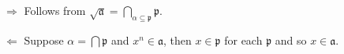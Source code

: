 $\Rightarrow$ Follows from $\sqrt{\mathfrak a}=\bigcap_{\alpha\subseteq\mathfrak p}\mathfrak p$.

$\Leftarrow$ Suppose $\alpha=\bigcap\mathfrak p$ and $x^n\in\mathfrak a$, then $x\in\mathfrak p$ for each $\mathfrak p$ and so $x\in\mathfrak a$.
